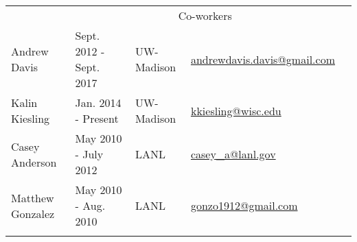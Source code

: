 \begin{longtable}{lllll}
               
				                   

              & \multicolumn{3}{c}{\Large{Co-workers}} &  \\  \vspace{2mm}

	      {Andrew Davis}\label{andy} & {Sept. 2012 - Sept. 2017} &
	      {UW-Madison} &
	      \href{mailto:andrewdavis.davis@gmail.com}{andrewdavis.davis@gmail.com} \\
	      \vspace{2mm}
{Kalin Kiesling}\label{kk} & {Jan. 2014 - Present} & {UW-Madison}  &
	\href{mailto:kkiesling@wisc.edu}{kkiesling@wisc.edu} \\ \vspace{2mm}  %

{Casey Anderson}\label{cas} & {May 2010 - July 2012} & {LANL}&
\href{mailto:casey\_a@lanl.com}{casey\_a@lanl.gov} \\ \vspace{2mm}%

{Matthew Gonzalez}\label{matt_gonzo} & {May 2010 - Aug. 2010} & {LANL} &
	\href{mailto:gonzo1912@gmail.com}{gonzo1912@gmail.com} \\ \vspace{2mm}%
     


\vspace{-12mm} %
\end{longtable}






%
